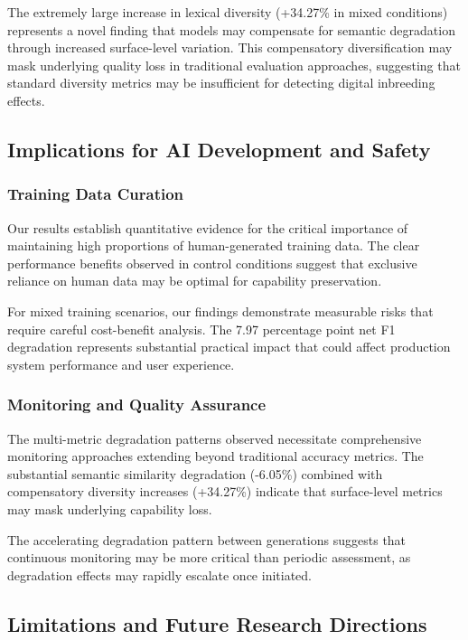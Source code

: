 \documentclass[11pt]{article}
\begin{document}
The extremely large increase in lexical diversity (+34.27\% in mixed conditions) represents a novel finding that models may compensate for semantic degradation through increased surface-level variation. This compensatory diversification may mask underlying quality loss in traditional evaluation approaches, suggesting that standard diversity metrics may be insufficient for detecting digital inbreeding effects.

\subsection{Implications for AI Development and Safety}

\subsubsection{Training Data Curation}

Our results establish quantitative evidence for the critical importance of maintaining high proportions of human-generated training data. The clear performance benefits observed in control conditions suggest that exclusive reliance on human data may be optimal for capability preservation.

For mixed training scenarios, our findings demonstrate measurable risks that require careful cost-benefit analysis. The 7.97 percentage point net F1 degradation represents substantial practical impact that could affect production system performance and user experience.

\subsubsection{Monitoring and Quality Assurance}

The multi-metric degradation patterns observed necessitate comprehensive monitoring approaches extending beyond traditional accuracy metrics. The substantial semantic similarity degradation (-6.05\%) combined with compensatory diversity increases (+34.27\%) indicate that surface-level metrics may mask underlying capability loss.

The accelerating degradation pattern between generations suggests that continuous monitoring may be more critical than periodic assessment, as degradation effects may rapidly escalate once initiated.

\subsection{Limitations and Future Research Directions}
\end{document}

